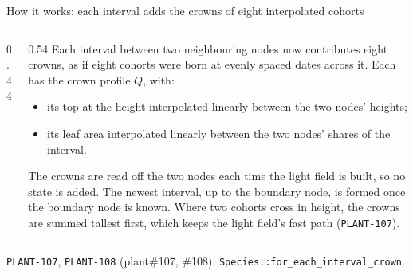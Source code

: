 \documentclass[aspectratio=169,10pt]{beamer}
\newcommand{\src}[1]{\par\vfill{\tiny\color{quiet} #1}}
\newcommand{\crown}[4]{\fill[accent!#4] (#1,#2) .. controls (#1+#3,#2-0.15) and (#1+0.7*#3,#2-0.75) .. (#1,#2-1.0)
  .. controls (#1-0.7*#3,#2-0.75) and (#1-#3,#2-0.15) .. (#1,#2);}
\begin{document}
\begin{frame}{How it works: each interval adds the crowns of eight interpolated cohorts}
  \begin{columns}[T]
    \begin{column}{0.44\textwidth}
    \end{column}
    \begin{column}{0.54\textwidth}
      \small
      Each interval between two neighbouring nodes now contributes eight crowns, as if eight
      cohorts were born at evenly spaced dates across it. Each has the crown profile $Q$, with:
      \begin{itemize}
        \item its top at the height interpolated linearly between the two nodes' heights;
        \item its leaf area interpolated linearly between the two nodes' shares of the interval.
      \end{itemize}
      The crowns are read off the two nodes each time the light field is built, so no state is
      added. The newest interval, up to the boundary node, is formed once the boundary node is
      known. Where two cohorts cross in height, the crowns are summed tallest first, which keeps
      the light field's fast path (\texttt{PLANT-107}).
    \end{column}
  \end{columns}
  \src{\texttt{PLANT-107}, \texttt{PLANT-108} (plant\#107, \#108); \texttt{Species::for\_each\_interval\_crown}.}
\end{frame}
\end{document}
